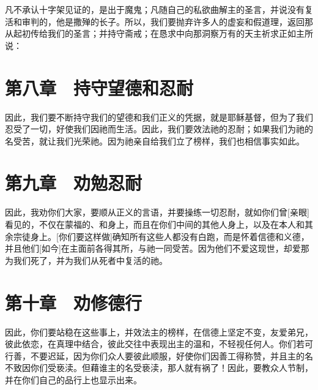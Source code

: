 凡不承认十字架见证的，是出于魔鬼；凡随自己的私欲曲解主的圣言，并说没有复活和审判的，他是撒殚的长子。所以，我们要抛弃许多人的虚妄和假道理，返回那从起初传给我们的圣言；并持守斋戒；在恳求中向那洞察万有的天主祈求正如主所说：\par


\section{第八章　持守望德和忍耐}

因此，我们要不断持守我们的望德和我们正义的凭据，就是耶稣基督，但为了我们忍受了一切，好使我们因祂而生活。因此，我们要效法祂的忍耐；如果我们为祂的名受苦，就让我们光荣祂。因为祂亲自给我们立了榜样，我们也相信事实如此。\par


\section{第九章　劝勉忍耐}

因此，我劝你们大家，要顺从正义的言语，并要操练一切忍耐，就如你们曾[亲眼]看见的，不仅在蒙福的、和身上，而且在你们中间的其他人身上，以及在本人和其余宗徒身上。[你们要这样做]确知所有这些人都没有白跑，而是怀着信德和义德，并且他们[如今]在主面前各得其所，与祂一同受苦。因为他们不爱这现世，却爱那为我们死了，并为我们从死者中复活的祂。\par


\section{第十章　劝修德行}

因此，你们要站稳在这些事上，并效法主的榜样，在信德上坚定不变，友爱弟兄，彼此依恋，在真理中结合，彼此交往中表现出主的温和，不轻视任何人。你们若可行善，不要迟延，因为你们众人要彼此顺服，好使你们因善工得称赞，并且主的名不致因你们受亵渎。但藉谁主的名受亵渎，那人就有祸了！因此，要教众人节制，并在你们自己的品行上也显示出来。\par

